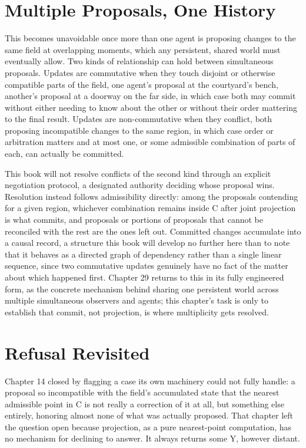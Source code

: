 \section{Multiple Proposals, One History}

This becomes unavoidable once more than one agent is proposing changes to the same field at overlapping moments, which any persistent, shared world must eventually allow. Two kinds of relationship can hold between simultaneous proposals. Updates are commutative when they touch disjoint or otherwise compatible parts of the field, one agent's proposal at the courtyard's bench, another's proposal at a doorway on the far side, in which case both may commit without either needing to know about the other or without their order mattering to the final result. Updates are non-commutative when they conflict, both proposing incompatible changes to the same region, in which case order or arbitration matters and at most one, or some admissible combination of parts of each, can actually be committed.

This book will not resolve conflicts of the second kind through an explicit negotiation protocol, a designated authority deciding whose proposal wins. Resolution instead follows admissibility directly: among the proposals contending for a given region, whichever combination remains inside C after joint projection is what commits, and proposals or portions of proposals that cannot be reconciled with the rest are the ones left out. Committed changes accumulate into a causal record, a structure this book will develop no further here than to note that it behaves as a directed graph of dependency rather than a single linear sequence, since two commutative updates genuinely have no fact of the matter about which happened first. Chapter 29 returns to this in its fully engineered form, as the concrete mechanism behind sharing one persistent world across multiple simultaneous observers and agents; this chapter's task is only to establish that commit, not projection, is where multiplicity gets resolved.

\section{Refusal Revisited}

Chapter 14 closed by flagging a case its own machinery could not fully handle: a proposal so incompatible with the field's accumulated state that the nearest admissible point in C is not really a correction of it at all, but something else entirely, honoring almost none of what was actually proposed. That chapter left the question open because projection, as a pure nearest-point computation, has no mechanism for declining to answer. It always returns some Y, however distant.


